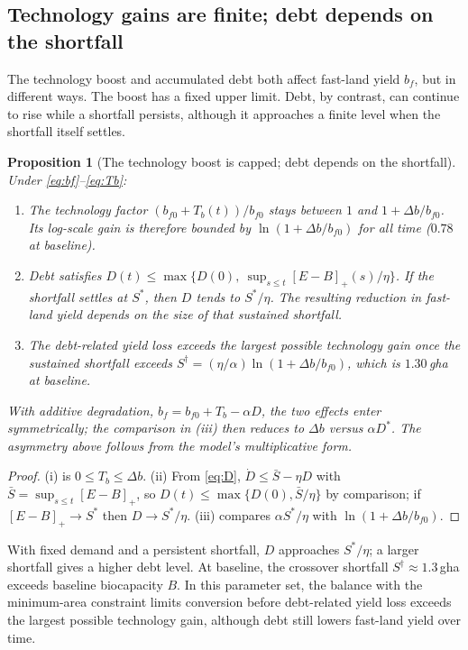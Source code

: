 \documentclass[preprint,12pt,authoryear]{elsarticle}
\newtheorem{proposition}{Proposition}
\newcommand{\pos}[1]{\left[#1\right]_+}
\begin{document}
\subsection{Technology gains are finite; debt depends on the shortfall}\label{sec:bounded}

The technology boost and accumulated debt both affect fast-land yield $b_f$, but in different ways. The boost has a fixed upper limit. Debt, by contrast, can continue to rise while a shortfall persists, although it approaches a finite level when the shortfall itself settles.

\begin{proposition}[The technology boost is capped; debt depends on the shortfall]\label{prop:bounded}
Under \eqref{eq:bf}--\eqref{eq:Tb}:
\begin{enumerate}[label=(\roman*)]
\item The technology factor $(b_{f0}+T_b(t))/b_{f0}$ stays between $1$ and $1+\Delta b/b_{f0}$. Its log-scale gain is therefore bounded by $\ln(1+\Delta b/b_{f0})$ for all time ($0.78$ at baseline).
\item Debt satisfies $D(t)\le\max\{D(0),\ \sup_{s\le t}\pos{E-B}(s)/\eta\}$. If the shortfall settles at $S^*$, then $D$ tends to $S^*/\eta$. The resulting reduction in fast-land yield depends on the size of that sustained shortfall.
\item The debt-related yield loss exceeds the largest possible technology gain once the sustained shortfall exceeds $S^\dagger=(\eta/\alpha)\ln(1+\Delta b/b_{f0})$, which is $1.30$\,gha at baseline.
\end{enumerate}
With additive degradation, $b_f=b_{f0}+T_b-\alpha D$, the two effects enter symmetrically; the comparison in (iii) then reduces to $\Delta b$ versus $\alpha D^*$. The asymmetry above follows from the model's multiplicative form.
\end{proposition}

\begin{proof}
(i) is $0\le T_b\le\Delta b$. (ii) From \eqref{eq:D}, $\dot D\le\bar S-\eta D$ with $\bar S=\sup_{s\le t}\pos{E-B}$, so $D(t)\le\max\{D(0),\bar S/\eta\}$ by comparison; if $\pos{E-B}\to S^*$ then $D\to S^*/\eta$. (iii) compares $\alpha S^*/\eta$ with $\ln(1+\Delta b/b_{f0})$.
\end{proof}

With fixed demand and a persistent shortfall, $D$ approaches $S^*/\eta$; a larger shortfall gives a higher debt level. At baseline, the crossover shortfall $S^\dagger\approx1.3$\,gha exceeds baseline biocapacity $B$. In this parameter set, the balance with the minimum-area constraint limits conversion before debt-related yield loss exceeds the largest possible technology gain, although debt still lowers fast-land yield over time.
\end{document}
